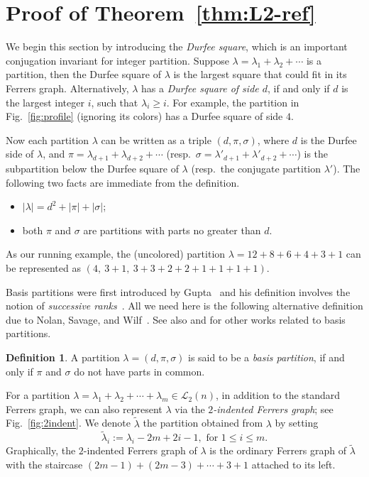 \documentclass[11pt,reqno]{amsart}
\numberwithin{equation}{section}
\theoremstyle{plain}
\theoremstyle{definition}
\newtheorem{Def}[theorem]{Definition}
\renewcommand{\L}{\mathcal{L}}
\begin{document}
\section{Proof of Theorem~\ref{thm:L2-ref}}\label{sec:L2}
We begin this section by introducing the {\it Durfee square}, which is an important conjugation invariant for integer partition. Suppose $\lambda=\lambda_1+\lambda_2+\cdots$ is a partition, then the Durfee square of $\lambda$ is the largest square that could fit in its Ferrers graph. Alternatively, $\lambda$ has a {\it Durfee square of side $d$}, if and only if $d$ is the largest integer $i$, such that $\lambda_i\ge i$. For example, the partition in Fig.~\ref{fig:profile} (ignoring its colors) has a Durfee square of side $4$. 

Now each partition $\lambda$ can be written as a triple $(d,\pi,\sigma)$, where $d$ is the Durfee side of $\lambda$, and $\pi=\lambda_{d+1}+\lambda_{d+2}+\cdots$ (resp.~$\sigma=\lambda'_{d+1}+\lambda'_{d+2}+\cdots$) is the subpartition below the Durfee square of $\lambda$ (resp.~the conjugate partition $\lambda'$). The following two facts are immediate from the definition.
\begin{itemize}
  \item $|\lambda|=d^2+|\pi|+|\sigma|$;
  \item both $\pi$ and $\sigma$ are partitions with parts no greater than $d$.
\end{itemize}
As our running example, the (uncolored) partition $\lambda=12+8+6+4+3+1$ can be represented as $(4,~3+1,~3+3+2+2+1+1+1+1)$.

Basis partitions were first introduced by Gupta~\cite{gup78} and his definition involves the notion of {\it successive ranks}~\cite[Sect.~9.3]{andtp}. All we need here is the following alternative definition due to Nolan, Savage, and Wilf~\cite{NSW}. See also \cite{hir99} and \cite{and15} for other works related to basis partitions.

\begin{Def}{\cite[Thm.~3]{NSW}}\label{def:basis}
A partition $\lambda=(d,\pi,\sigma)$ is said to be a {\it basis partition}, if and only if $\pi$ and $\sigma$ do not have parts in common.
\end{Def}

For a partition $\lambda=\lambda_1+\lambda_2+\cdots+\lambda_m \in\L_2(n)$, in addition to the standard Ferrers graph, we can also represent $\lambda$ via the {\it $2$-indented Ferrers graph}; see Fig.~\ref{fig:2indent}. We denote $\tilde{\lambda}$ the partition obtained from $\lambda$ by setting
$$\tilde{\lambda}_i:=\lambda_i-2m+2i-1, \text{ for $1\le i\le m$}.$$
Graphically, the $2$-indented Ferrers graph of $\lambda$ is the ordinary Ferrers graph of $\tilde{\lambda}$ with the staircase $(2m-1)+(2m-3)+\cdots+3+1$ attached to its left.
\end{document}
